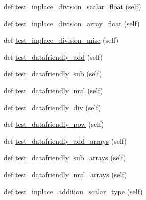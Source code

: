 \begin{DoxyCompactItemize}
\item 
def \hyperlink{classnumpy_1_1ma_1_1tests_1_1test__core_1_1TestMaskedArrayInPlaceArithmetics_a0f232144fe695f8c6f8fc592594e6b9f}{test\+\_\+inplace\+\_\+division\+\_\+scalar\+\_\+float} (self)
\item 
def \hyperlink{classnumpy_1_1ma_1_1tests_1_1test__core_1_1TestMaskedArrayInPlaceArithmetics_a8078efd12a2e9276d5eb0cb6191bd271}{test\+\_\+inplace\+\_\+division\+\_\+array\+\_\+float} (self)
\item 
def \hyperlink{classnumpy_1_1ma_1_1tests_1_1test__core_1_1TestMaskedArrayInPlaceArithmetics_a259db1cfec6046a208a91d96a2e41311}{test\+\_\+inplace\+\_\+division\+\_\+misc} (self)
\item 
def \hyperlink{classnumpy_1_1ma_1_1tests_1_1test__core_1_1TestMaskedArrayInPlaceArithmetics_a1727ef7d7e5898e12981df5dbbf21afb}{test\+\_\+datafriendly\+\_\+add} (self)
\item 
def \hyperlink{classnumpy_1_1ma_1_1tests_1_1test__core_1_1TestMaskedArrayInPlaceArithmetics_a0a79c8359aa7fe0a77a95fdad7a3c471}{test\+\_\+datafriendly\+\_\+sub} (self)
\item 
def \hyperlink{classnumpy_1_1ma_1_1tests_1_1test__core_1_1TestMaskedArrayInPlaceArithmetics_a8ff88754ff1f11bcbfbf7a0ae87f7b75}{test\+\_\+datafriendly\+\_\+mul} (self)
\item 
def \hyperlink{classnumpy_1_1ma_1_1tests_1_1test__core_1_1TestMaskedArrayInPlaceArithmetics_aef40cc655be46ceba6f29f5e5591cf72}{test\+\_\+datafriendly\+\_\+div} (self)
\item 
def \hyperlink{classnumpy_1_1ma_1_1tests_1_1test__core_1_1TestMaskedArrayInPlaceArithmetics_a34ceea0e57cd1c4bd9b0eaa800067cd8}{test\+\_\+datafriendly\+\_\+pow} (self)
\item 
def \hyperlink{classnumpy_1_1ma_1_1tests_1_1test__core_1_1TestMaskedArrayInPlaceArithmetics_a0ecf4b9f99e63571f6e7027d7e47437a}{test\+\_\+datafriendly\+\_\+add\+\_\+arrays} (self)
\item 
def \hyperlink{classnumpy_1_1ma_1_1tests_1_1test__core_1_1TestMaskedArrayInPlaceArithmetics_ae550fadf0e73d89961572630b731fd90}{test\+\_\+datafriendly\+\_\+sub\+\_\+arrays} (self)
\item 
def \hyperlink{classnumpy_1_1ma_1_1tests_1_1test__core_1_1TestMaskedArrayInPlaceArithmetics_a26dd64d237c2c0e8aa7ad4e9deb69aac}{test\+\_\+datafriendly\+\_\+mul\+\_\+arrays} (self)
\item 
def \hyperlink{classnumpy_1_1ma_1_1tests_1_1test__core_1_1TestMaskedArrayInPlaceArithmetics_a5f294eff730fd4fa50709d45d5e47965}{test\+\_\+inplace\+\_\+addition\+\_\+scalar\+\_\+type} (self)

\end{DoxyCompactItemize}
